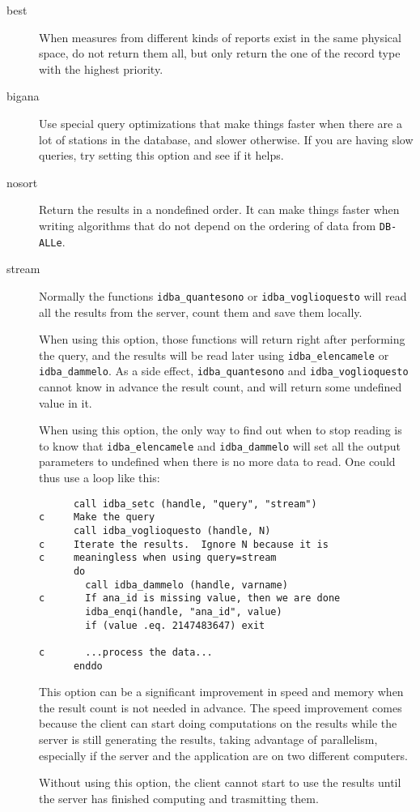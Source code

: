 \documentclass[final,12pt,a4paper,twoside]{book}
\newcommand{\dballe}{{\tt DB-ALLe}}
\begin{document}
\begin{description}
\item [best]
  When measures from different kinds of reports exist in the same physical
  space, do not return them all, but only return the one of the record type
  with the highest priority.
\item [bigana]
  Use special query optimizations that make things faster when there are a lot
  of stations in the database, and slower otherwise.  If you are having slow
  queries, try setting this option and see if it helps.
\item [nosort]
  Return the results in a nondefined order.  It can make things faster when
  writing algorithms that do not depend on the ordering of data from \dballe{}.
\item [stream]
  Normally the functions {\tt idba\_quantesono} or {\tt idba\_voglioquesto}
  will read all the results from the server, count them and save them locally.

  When using this option, those functions will return right after performing
  the query, and the results will be read later using {\tt idba\_elencamele} or
  {\tt idba\_dammelo}.  As a side effect, {\tt idba\_quantesono} and
  {\tt idba\_voglioquesto} cannot know in advance the result count, and will
  return some undefined value in it.

  When using this option, the only way to find out when to stop reading is to
  know that {\tt idba\_elencamele} and {\tt idba\_dammelo} will set all the
  output parameters to undefined when there is no more data to read.  One could
  thus use a loop like this:
  \begin{verbatim}
      call idba_setc (handle, "query", "stream")
c     Make the query
      call idba_voglioquesto (handle, N)
c     Iterate the results.  Ignore N because it is
c     meaningless when using query=stream
      do
        call idba_dammelo (handle, varname)
c       If ana_id is missing value, then we are done
        idba_enqi(handle, "ana_id", value)
        if (value .eq. 2147483647) exit

c       ...process the data...
      enddo
  \end{verbatim}

  This option can be a significant improvement in speed and memory when the
  result count is not needed in advance.  The speed improvement comes because
  the client can start doing computations on the results while the server is
  still generating the results, taking advantage of parallelism, especially if
  the server and the application are on two different computers.

  Without using this option, the client cannot start to use the results until
  the server has finished computing and trasmitting them.
\end{description}
\end{document}
